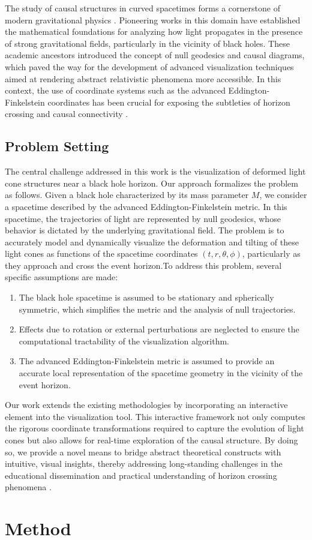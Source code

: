\documentclass{article}
\begin{document}
The study of causal structures in curved spacetimes forms a cornerstone of modern gravitational physics \cite{Reference1 Reference2}. Pioneering works in this domain have established the mathematical foundations for analyzing how light propagates in the presence of strong gravitational fields, particularly in the vicinity of black holes. These academic ancestors introduced the concept of null geodesics and causal diagrams, which paved the way for the development of advanced visualization techniques aimed at rendering abstract relativistic phenomena more accessible. In this context, the use of coordinate systems such as the advanced Eddington-Finkelstein coordinates has been crucial for exposing the subtleties of horizon crossing and causal connectivity \cite{Reference3}.\subsection{Problem Setting}The central challenge addressed in this work is the visualization of deformed light cone structures near a black hole horizon. Our approach formalizes the problem as follows. Given a black hole characterized by its mass parameter $M$, we consider a spacetime described by the advanced Eddington-Finkelstein metric. In this spacetime, the trajectories of light are represented by null geodesics, whose behavior is dictated by the underlying gravitational field. The problem is to accurately model and dynamically visualize the deformation and tilting of these light cones as functions of the spacetime coordinates $(t, r, \theta, \phi)$, particularly as they approach and cross the event horizon.To address this problem, several specific assumptions are made:\begin{enumerate}  \item The black hole spacetime is assumed to be stationary and spherically symmetric, which simplifies the metric and the analysis of null trajectories.  \item Effects due to rotation or external perturbations are neglected to ensure the computational tractability of the visualization algorithm.  \item The advanced Eddington-Finkelstein metric is assumed to provide an accurate local representation of the spacetime geometry in the vicinity of the event horizon.\end{enumerate}Our work extends the existing methodologies by incorporating an interactive element into the visualization tool. This interactive framework not only computes the rigorous coordinate transformations required to capture the evolution of light cones but also allows for real-time exploration of the causal structure. By doing so, we provide a novel means to bridge abstract theoretical constructs with intuitive, visual insights, thereby addressing long-standing challenges in the educational dissemination and practical understanding of horizon crossing phenomena \cite{Reference4}.\section{Method}
\end{document}
